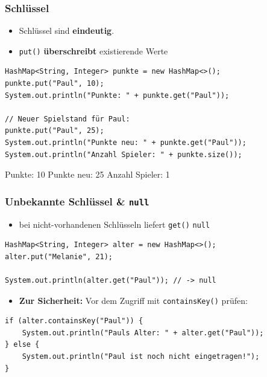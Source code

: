 \documentclass{../../presentation}
\begin{document}
\begin{frame}[fragile]
	\frametitle{Schlüssel}
	\begin{itemize}
		\item Schlüssel sind \textbf{eindeutig}.
		\item \texttt{put()} \textbf{überschreibt} existierende Werte
	\end{itemize}
	\pause
	\begin{verbatim}
HashMap<String, Integer> punkte = new HashMap<>();
punkte.put("Paul", 10);
System.out.println("Punkte: " + punkte.get("Paul"));

// Neuer Spielstand für Paul:
punkte.put("Paul", 25);
System.out.println("Punkte neu: " + punkte.get("Paul"));
System.out.println("Anzahl Spieler: " + punkte.size());
	\end{verbatim}
	\pause
	\begin{ausgabe}
		Punkte: 10 \newline
		Punkte neu: 25 \newline
		Anzahl Spieler: 1
	\end{ausgabe}
\end{frame}

\begin{frame}[fragile]
	\frametitle{Unbekannte Schlüssel \& \texttt{null}}
	\begin{itemize}
		\item bei nicht-vorhandenen Schlüsseln liefert \texttt{get()} \texttt{null}
	\end{itemize}
	\pause
	\begin{verbatim}
HashMap<String, Integer> alter = new HashMap<>();
alter.put("Melanie", 21);

System.out.println(alter.get("Paul")); // -> null
	\end{verbatim}
	\pause
	\begin{itemize}
		\item \textbf{Zur Sicherheit:} Vor dem Zugriff mit \texttt{containsKey()} prüfen:
	\end{itemize}
	\begin{verbatim}
if (alter.containsKey("Paul")) {
    System.out.println("Pauls Alter: " + alter.get("Paul"));
} else {
    System.out.println("Paul ist noch nicht eingetragen!");
}
	\end{verbatim}
\end{frame}
\end{document}
